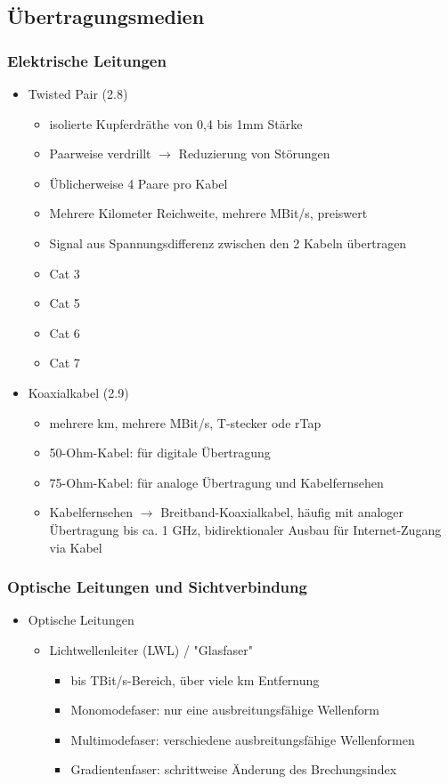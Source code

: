 \subsection{Übertragungsmedien}
\subsubsection{Elektrische Leitungen}
\begin{itemize}
	\item Twisted Pair (2.8)
	\begin{itemize}
		\item isolierte Kupferdräthe von 0,4 bis 1mm Stärke
		\item Paarweise verdrillt \(\to\) Reduzierung von Störungen
		\item Üblicherweise 4 Paare pro Kabel
		\item Mehrere Kilometer Reichweite, mehrere MBit/s, preiswert
		\item Signal aus Spannungsdifferenz zwischen den 2 Kabeln übertragen
		\item Cat 3
		\item Cat 5
		\item Cat 6
		\item Cat 7
	\end{itemize}
	\item Koaxialkabel (2.9)
	\begin{itemize}
		\item mehrere km, mehrere MBit/s, T-stecker ode rTap
		\item 50-Ohm-Kabel: für digitale Übertragung
		\item 75-Ohm-Kabel: für analoge Übertragung und Kabelfernsehen
		\item Kabelfernsehen \(\to\) Breitband-Koaxialkabel, häufig mit analoger Übertragung bis ca. 1 GHz, bidirektionaler Ausbau für Internet-Zugang via Kabel
	\end{itemize}
\end{itemize}

\subsubsection{Optische Leitungen und Sichtverbindung}
\begin{itemize}
	\item Optische Leitungen
	\begin{itemize}
		\item Lichtwellenleiter (LWL) / "Glasfaser"
		\begin{itemize}
			\item bis TBit/s-Bereich, über viele km Entfernung
			\item Monomodefaser: nur eine ausbreitungsfähige Wellenform
			\item Multimodefaser: verschiedene ausbreitungsfähige Wellenformen
			\item Gradientenfaser: schrittweise Änderung des Brechungsindex
		\end{itemize}
	\end{itemize}
\end{itemize}

